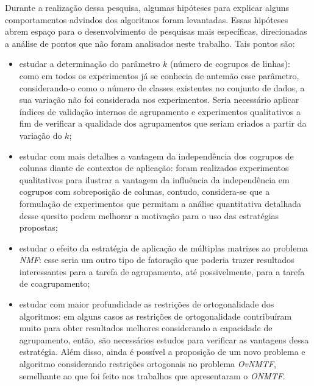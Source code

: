 \documentclass[
    12pt,                %
    oneside,            %
    a4paper,            %
    english,            %
    brazil                %
    ]{abntex2ppgsi}
\begin{document}
Durante a realização dessa pesquisa, algumas hipóteses para explicar alguns comportamentos advindos dos algoritmos foram levantadas.
Essas hipóteses abrem espaço para o desenvolvimento de pesquisas mais específicas, direcionadas a análise de pontos que não foram analisados neste trabalho. Tais pontos são:
\begin{itemize}
    \item estudar a determinação do parâmetro $k$ (número de cogrupos de linhas): como em todos os experimentos já se conhecia de antemão esse parâmetro, considerando-o como o número de classes existentes no conjunto de dados, a sua variação não foi considerada nos experimentos. Seria necessário aplicar índices de validação internos de agrupamento e experimentos qualitativos a fim de verificar a qualidade dos agrupamentos que seriam criados a partir da variação do $k$;
    \item estudar com mais detalhes a vantagem da independência dos cogrupos de colunas diante de contextos de aplicação: foram realizados experimentos qualitativos para ilustrar a vantagem da influência da independência em cogrupos com sobreposição de colunas, contudo, considera-se que a formulação de experimentos que permitam a análise quantitativa detalhada desse quesito podem melhorar a motivação para o uso das estratégias propostas;
    \item estudar o efeito da estratégia de aplicação de múltiplas matrizes ao problema \textit{NMF}: esse seria um outro tipo de fatoração que poderia trazer resultados interessantes para a tarefa de agrupamento, até possivelmente, para a tarefa de coagrupamento;
    \item estudar com maior profundidade as restrições de ortogonalidade dos algoritmos: em alguns casos as restrições de ortogonalidade contribuíram muito para obter resultados melhores considerando a capacidade de agrupamento, então, são necessários estudos para verificar as vantagens dessa estratégia. Além disso, ainda é possível a proposição de um novo problema e algoritmo considerando restrições ortogonais no problema \textit{OvNMTF}, semelhante ao que foi feito nos trabalhos que apresentaram o \textit{ONMTF}.
\end{itemize}



\end{document}

